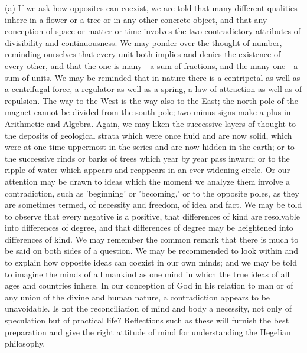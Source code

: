 \documentclass[11pt,letter]{article}
\begin{document}
\par  (a) If we ask how opposites can coexist, we are told that many different qualities inhere in a flower or a tree or in any other concrete object, and that any conception of space or matter or time involves the two contradictory attributes of divisibility and continuousness. We may ponder over the thought of number, reminding ourselves that every unit both implies and denies the existence of every other, and that the one is many—a sum of fractions, and the many one—a sum of units. We may be reminded that in nature there is a centripetal as well as a centrifugal force, a regulator as well as a spring, a law of attraction as well as of repulsion. The way to the West is the way also to the East; the north pole of the magnet cannot be divided from the south pole; two minus signs make a plus in Arithmetic and Algebra. Again, we may liken the successive layers of thought to the deposits of geological strata which were once fluid and are now solid, which were at one time uppermost in the series and are now hidden in the earth; or to the successive rinds or barks of trees which year by year pass inward; or to the ripple of water which appears and reappears in an ever-widening circle. Or our attention may be drawn to ideas which the moment we analyze them involve a contradiction, such as 'beginning' or 'becoming,' or to the opposite poles, as they are sometimes termed, of necessity and freedom, of idea and fact. We may be told to observe that every negative is a positive, that differences of kind are resolvable into differences of degree, and that differences of degree may be heightened into differences of kind. We may remember the common remark that there is much to be said on both sides of a question. We may be recommended to look within and to explain how opposite ideas can coexist in our own minds; and we may be told to imagine the minds of all mankind as one mind in which the true ideas of all ages and countries inhere. In our conception of God in his relation to man or of any union of the divine and human nature, a contradiction appears to be unavoidable. Is not the reconciliation of mind and body a necessity, not only of speculation but of practical life? Reflections such as these will furnish the best preparation and give the right attitude of mind for understanding the Hegelian philosophy.
\end{document}
